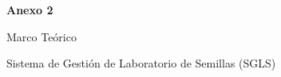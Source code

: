 \clearpage
\setcounter{subsection}{0}
\setcounter{subsubsection}{0}
\vspace*{3cm}
{\centering
{\Huge\bfseries Anexo 2\par}
\vspace{1cm}
{\LARGE Marco Teórico\par}
\vspace{2cm}
{\large Sistema de Gestión de Laboratorio de Semillas (SGLS)\par}
\vfill
\par}
\clearpage
